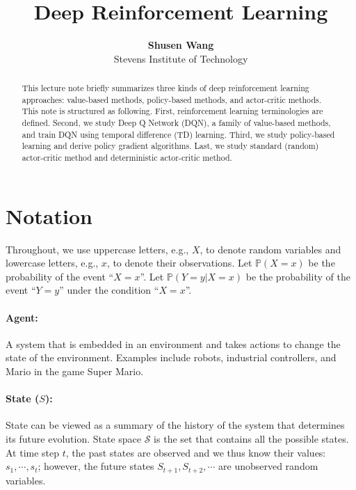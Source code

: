 \documentclass[11pt]{article}
\numberwithin{equation}{section}
\def\SM{{\mathcal S}}
\def\PB{{\mathbb P}}
\begin{document}


\title{Deep Reinforcement Learning}

\author{\textbf{Shusen Wang} \\ Stevens Institute of Technology}


\maketitle

\begin{abstract}
This lecture note briefly summarizes three kinds of deep reinforcement learning approaches: value-based methods, policy-based methods, and actor-critic methods.
This note is structured as following.
First, reinforcement learning terminologies are defined.
Second, we study Deep Q Network (DQN), a family of value-based methods, and train DQN using temporal difference (TD) learning.
Third, we study policy-based learning and derive policy gradient algorithms.
Last, we study standard (random) actor-critic method and deterministic actor-critic method.
\end{abstract}



\section{Notation}

Throughout, we use uppercase letters, e.g., $X$, to denote random variables and lowercase letters, e.g., $x$, to denote their observations.
Let $\PB (X = x)$ be the probability of the event ``$X = x$''.
Let $\PB (Y=y | X=x)$ be the probability of the event ``$Y=y$'' under the condition ``$X=x$''.

\paragraph{Agent:}
A system that is embedded in an environment and takes actions to change the state of the environment. Examples include robots, industrial controllers, and Mario in the game Super Mario.


\paragraph{State ($S$):}
State can be viewed as a summary of the history of the system that determines its future evolution.
State space $\SM$ is the set that contains all the possible states.
At time step $t$, the past states are observed and we thus know their values: $s_1, \cdots , s_t$;
however, the future states $S_{t+1}, S_{t+2}, \cdots $ are unobserved random variables.
\end{document}
